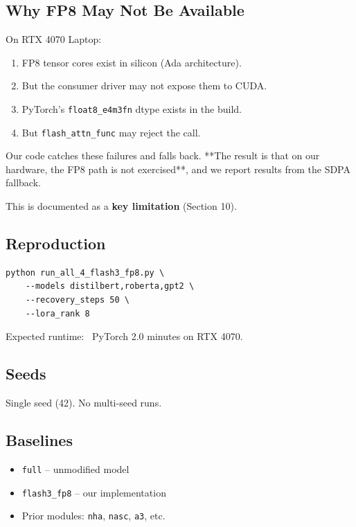 \subsection{Why FP8 May Not Be Available}

On RTX 4070 Laptop:

\begin{enumerate}
\item FP8 tensor cores exist in silicon (Ada architecture).
\item But the consumer driver may not expose them to CUDA.
\item PyTorch's \texttt{float8\_e4m3fn} dtype exists in the build.
\item But \texttt{flash\_attn\_func} may reject the call.

\end{enumerate}
Our code catches these failures and falls back. **The result is that on 
our hardware, the FP8 path is not exercised**, and we report results from 
the SDPA fallback.

This is documented as a \textbf{key limitation} (Section 10).

\subsection{Reproduction}

\begin{lstlisting}
python run_all_4_flash3_fp8.py \
    --models distilbert,roberta,gpt2 \
    --recovery_steps 50 \
    --lora_rank 8
\end{lstlisting}

Expected runtime: ~PyTorch 2.0 minutes on RTX 4070.

\subsection{Seeds}

Single seed (42). No multi-seed runs.

\subsection{Baselines}

\begin{itemize}
\item \texttt{full} -- unmodified model
\item \texttt{flash3\_fp8} -- our implementation
\item Prior modules: \texttt{nha}, \texttt{nasc}, \texttt{a3}, etc.

\end{itemize}
